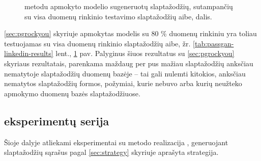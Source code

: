\documentclass{VUMIFInfBakalaurinis}
\begin{document}
\begin{figure}[!ht]
  \begin{center}
  \end{center}
  \caption{%
     metodu apmokyto modelio sugeneruotų slaptažodžių, 
    sutampančių su visa  duomenų rinkinio testavimo
    slaptažodžių aibe, dalis.
  }
  \label{plot:passgan-linkedin-results}
\end{figure}
\ref{sec:pgrockyou} skyriuje apmokytas modelis su $80$ \%  
duomenų rinkiniu yra toliau testuojamas su visa  duomenų 
rinkinio slaptažodžių aibe, žr. \ref{tab:passgan-linkedin-results} lent., 
\ref{plot:passgan-linkedin-results} pav. Palyginus šiuos rezultatus su 
\ref{sec:pgrockyou} skyriaus rezultatais, parenkama maždaug per pus mažiau 
slaptažodžių anksčiau nematytoje slaptažodžių duomenų bazėje -- tai gali nulemti 
kitokios, anksčiau nematytos slaptažodžių formos, požymiai, kurie nebuvo arba 
kurių neužteko apmokymo duomenų bazės slaptažodžiuose.

\subsection{ eksperimentų serija}
Šioje dalyje atliekami eksperimentai su  metodo realizacija 
\cite{PCFG:impl}, generuojant slaptažodžių sąrašus pagal \ref{sec:strategy} 
skyriuje aprašyta strategija.
\end{document}
